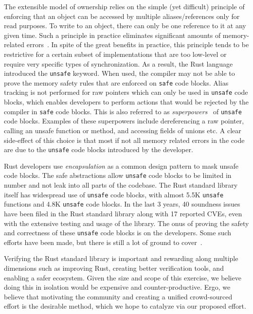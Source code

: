 \documentclass[runningheads]{llncs}
\begin{document}
The extensible model of ownership relies on the simple (yet difficult) principle of enforcing that an object can be accessed by multiple aliases/references only for read purposes. To write to an object, there can only be one reference to it at any given time. Such a principle in practice eliminates significant amounts of memory-related errors~\cite{rustAndroid}. In spite of the great benefits in practice, this principle tends to be restrictive for a certain subset of implementations that are too low-level or require very specific types of synchronization. As a result, the Rust language introduced the \texttt{unsafe} keyword. When used, the compiler may not be able to prove the memory safety rules that are enforced on \texttt{safe} code blocks. Alias tracking is not performed for raw pointers which can only be used in \texttt{unsafe} code blocks, which enables developers to perform actions that would be rejected by the compiler in \texttt{safe} code blocks. This is also referred to as \textit{superpowers}~\cite{superPower} of \texttt{unsafe} code blocks. Examples of these superpowers include dereferencing a raw pointer, calling an unsafe function or method, and accessing fields of unions etc. A clear side-effect of this choice is that most if not all memory related errors in the code are due to the \texttt{unsafe} code blocks introduced by the developer. 

Rust developers use \textit{encapsulation} as a common design pattern to mask unsafe code blocks. The safe abstractions allow \texttt{unsafe} code blocks to be limited in number and not leak into all parts of the codebase. The Rust standard library itself has widespread use of \texttt{unsafe} code blocks, with almost 5.5K \texttt{unsafe} functions and 4.8K \texttt{unsafe} code blocks. In the last 3 years, 40 soundness issues have been filed in the Rust standard library along with 17 reported CVEs, even with the extensive testing and usage of the library. The onus of proving the safety and correctness of these \texttt{unsafe} code blocks is on the developers. Some such efforts have been made, but there is still a lot of ground to cover~\cite{jung2017rustbelt}.

Verifying the Rust standard library is important and rewarding along multiple dimensions such as improving Rust, creating better verification tools, and enabling a safer ecosystem. Given the size and scope of this exercise, we believe doing this in isolation would be expensive and counter-productive. Ergo, we believe that motivating the community and creating a unified crowd-sourced effort is the desirable method, which we hope to catalyze via our proposed effort. 
\end{document}
